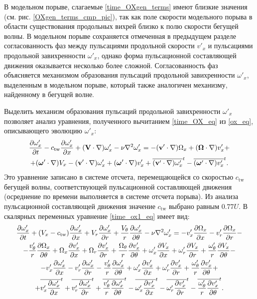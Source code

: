 В модельном порыве, слагаемые \eqref{time_OXgen_terms} имеют близкие значения (см. рис. \ref{OXgen_terms_cmp_pic}), так как поле скорости модельного порыва в области существования продольных вихрей близко к полю скорости бегущей волны. В модельном порыве сохраняется отмеченная в предыдущем разделе согласованность фаз между пульсациями продольной скорости $v'_x$ и пульсациями продольной завихренности $\omega'_x$, однако форма пульсационной составляющей движения оказывается несколько более сложной. Согласованность фаз объясняется механизмом образования пульсаций продольной завихренности $\omega'_x$, выделенным в модельном порыве, который также аналогичен механизму, найденному в бегущей волне. 

Выделить механизм образования пульсаций продольной завихренности $\omega'_x$ позволяет анализ уравнения, полученного вычитанием \eqref{time_OX_eq} из \eqref{ox_eq}, описывающего эволюцию $\omega'_x$:
\begin{multline}\label{time_ox1_eq}
\frac{\partial \omega'_x}{\partial t} - c_\mathrm{tw}\frac{\partial \omega'_x}{\partial x} + (\mathbf{V} \cdot \nabla) \omega'_x - \nu \nabla^2 \omega'_x = - (\mathbf{v}' \cdot \nabla) \Omega_x +(\mbox{\boldmath$\Omega$} \cdot \nabla) v'_x + \\ + (\mbox{\boldmath$\omega$}' \cdot \nabla) V_x - (\mathbf{v}' \cdot \nabla) \omega'_x  + (\mbox{\boldmath$\omega$}' \cdot \nabla) v'_x  + \overline{(\mathbf{v}' \cdot \nabla) \omega'_x}^t  - \overline{(\mbox{\boldmath$\omega$}' \cdot \nabla)v'_x}^t.
\end{multline}
Это уравнение записано в системе отсчета, перемещающейся со скоростью $c_\mathrm{tw}$ бегущей волны, соответствующей пульсационной составляющей движения (осреднение по времени выполняется в системе отсчета порыва). Из анализа пульсационной составляющей движения значение $c_\mathrm{tw}$ выбрано равным $0.77U$. 
В скалярных переменных уравнение \eqref{time_ox1_eq} имеет вид:
\begin{multline}\label{time_ox2_eq}
\frac{\partial \omega'_x}{\partial t} + (V_x - c_\mathrm{tw})\frac{\partial \omega'_x}{\partial x} + V_r \frac{\partial \omega_x'}{\partial r} + \frac{V_\theta}{r} \frac{\partial \omega'_x}{\partial \theta} 
- \nu\nabla^2\omega'_x = - v'_x \frac{\partial \Omega_x}{\partial x} - v'_r \frac{\partial \Omega_x}{\partial r} - \\ - \frac{v'_\theta}{r} \frac{\partial \Omega_x}{\partial \theta} 
+ \Omega_x \frac{\partial v'_x}{\partial x} + \Omega_r \frac{\partial v'_x}{\partial r} + \frac{\Omega_\theta}{r} \frac{\partial v'_x}{\partial \theta}
+ \omega'_x \frac{\partial V_x}{\partial x} + \omega'_r \frac{\partial V_x}{\partial r} + \frac{\omega'_\theta}{r} \frac{\partial V_x}{\partial \theta} - \\ 
- v'_x \frac{\partial \omega'_x}{\partial x} - v'_r \frac{\partial \omega'_x}{\partial r} - \frac{v'_\theta}{r} \frac{\partial \omega'_x}{\partial \theta} 
+ \omega'_x \frac{\partial v'_x}{\partial x} + \omega'_r \frac{\partial v'_x}{\partial r} + \frac{\omega'_\theta}{r} \frac{\partial v'_x}{\partial \theta} + \\
+ \overline{v'_x \frac{\partial \omega'_x}{\partial x}}^t + \overline{v'_r \frac{\partial \omega'_x}{\partial r}}^t + \overline{\frac{v'_\theta}{r} \frac{\partial \omega'_x}{\partial \theta}}^t
- \overline{\omega'_x \frac{\partial v'_x}{\partial x}}^t - \overline{\omega'_r \frac{\partial v'_x}{\partial r}}^t - \overline{\frac{\omega'_\theta}{r} \frac{\partial v'_x}{\partial \theta}}^t.
\end{multline}
